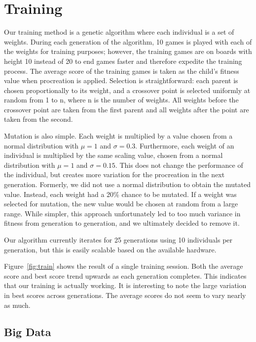 \documentclass[12pt, twocolumn]{article}
\begin{document}
\section*{Training}
Our training method is a genetic algorithm where each individual is a set of weights. During each generation of the algorithm, 10 games is played with each of the weights for training purposes; however, the training games are on boards with height 10 instead of 20 to end games faster and therefore expedite the training process. The average score of the training games is taken as the child's fitness value when procreation is applied. Selection is straightforward: each parent is chosen proportionally to its weight, and a crossover point is selected uniformly at random from 1 to n, where n is the number of weights. All weights before the crossover point are taken from the first parent and all weights after the point are taken from the second. 

Mutation is also simple. Each weight is multiplied by a value chosen from a normal distribution with $\mu = 1$ and $\sigma = 0.3$. Furthermore, each weight of an individual is multiplied by the same scaling value, chosen from a normal distribution with $\mu = 1$ and $\sigma = 0.15$. This does not change the performance of the individual, but creates more variation for the procreation in the next generation. Formerly, we did not use a normal distribution to obtain the mutated value. Instead, each weight had a 20\% chance to be mutated. If a weight was selected for mutation, the new value would be chosen at random from a large range. While simpler, this approach unfortunately led to too much variance in fitness from generation to generation, and we ultimately decided to remove it.

Our algorithm currently iterates for 25 generations using 10 individuals per generation, but this is easily scalable based on the available hardware.

Figure~\ref{fig:train} shows the result of a single training session. Both the average score and best score trend upwards as each generation completes. This indicates that our training is actually working. It is interesting to note the large variation in best scores across generations. The average scores do not seem to vary nearly as much.



\subsection*{Big Data}
\end{document}
